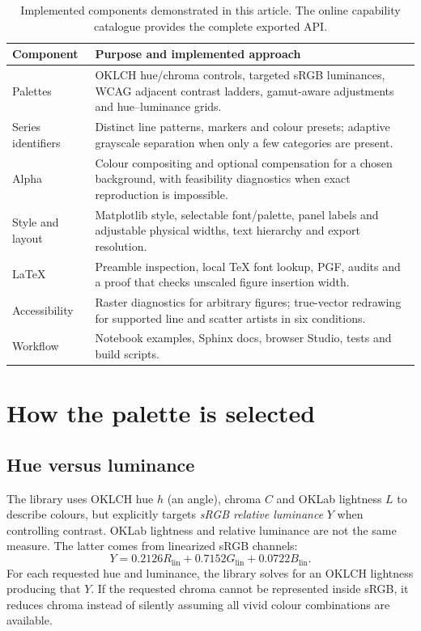 \documentclass[10pt,twocolumn,a4paper]{article}
\begin{document}
\begin{table}[t]
\caption{Implemented components demonstrated in this article.
The online capability catalogue provides the complete exported API.}
\label{tab:capabilities}
\centering
\small
\begin{tabularx}{\textwidth}{@{}p{}X@{}}
\toprule
Component & Purpose and implemented approach\\
\midrule
Palettes &
OKLCH hue/chroma controls, targeted sRGB luminances, WCAG adjacent
contrast ladders, gamut-aware adjustments and hue--luminance grids.\\
Series identifiers &
Distinct line patterns, markers and colour presets; adaptive
grayscale separation when only a few categories are present.\\
Alpha &
Colour compositing and optional compensation for a chosen background,
with feasibility diagnostics when exact reproduction is impossible.\\
Style and layout &
Matplotlib style, selectable font/palette, panel labels and
adjustable physical widths, text hierarchy and export resolution.\\
LaTeX &
Preamble inspection, local TeX font lookup, PGF, audits and
a proof that checks unscaled figure insertion width.\\
Accessibility &
Raster diagnostics for arbitrary figures; true-vector redrawing
for supported line and scatter artists in six conditions.\\
Workflow &
Notebook examples, Sphinx docs, browser Studio, tests and build scripts.\\
\bottomrule
\end{tabularx}
\end{table}

\section{How the palette is selected}
\subsection{Hue versus luminance}
The library uses OKLCH hue $h$ (an angle), chroma $C$ and
OKLab lightness $L$ to describe colours, but explicitly targets
\emph{sRGB relative luminance} $Y$ when controlling contrast.
OKLab lightness and relative luminance are not the same measure.
The latter comes from linearized sRGB channels:
\begin{equation}
 Y=0.2126R_{\mathrm{lin}}+
   0.7152G_{\mathrm{lin}}+
   0.0722B_{\mathrm{lin}} .
\end{equation}
For each requested hue and luminance, the library solves for an
OKLCH lightness producing that $Y$. If the requested chroma
cannot be represented inside sRGB, it reduces chroma instead
of silently assuming all vivid colour combinations are available.
\end{document}
